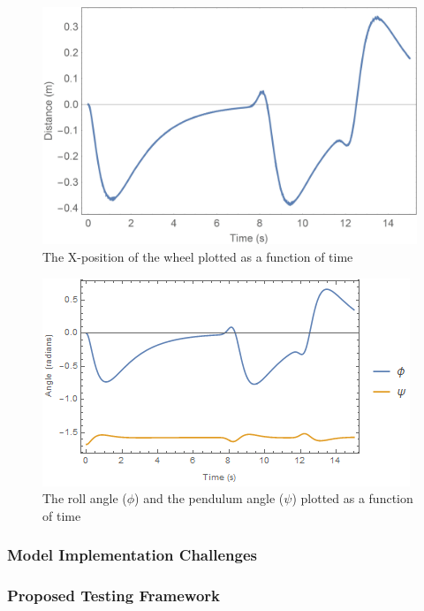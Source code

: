 \begin{figure}[!htb]
	\centering
	\includegraphics[width=\linewidth]{wheelperturbdistance.jpg}
	\endminipage\hspace{1em}%
	\caption{The X-position of the wheel plotted as a function of time}\label{fig:wheelperturbdistance}
\end{figure}

\begin{figure}[!htb]
	\centering
	\includegraphics[width=\linewidth]{wheelperturbphipsi.png}
	\endminipage\hspace{1em}%
	\caption{The roll angle ($\phi$) and the pendulum angle ($\psi$) plotted as a function of time}\label{fig:wheelperturbphipsi}
\end{figure}

\par
\subsubsection{Model Implementation Challenges}
\subsubsection{Proposed Testing Framework}


